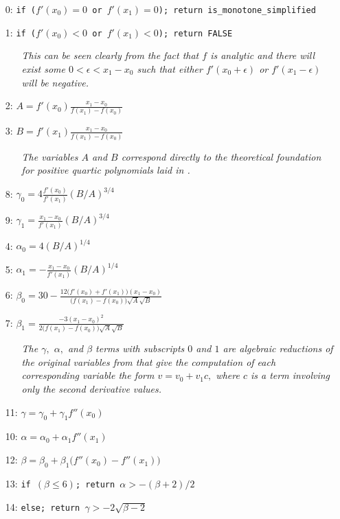 \documentclass{article}
\begin{document}
\begin{itemize}
  \itemsep0pt
  \parskip0pt

\item[0:] \texttt{if ($f'(x_0) = 0$ or $f'(x_1) = 0$); return is\_monotone\_simplified}
\item[1:] \texttt{if ($f'(x_0) < 0$ or $f'(x_1) < 0$); return FALSE}
  \begin{itemize}
    \item[] \textit{This can be seen clearly from the fact that $f$ is analytic and there will exist some $0 < \epsilon < x_1 - x_0$ such that either $f'(x_0 + \epsilon)$ or $f'(x_1 - \epsilon)$ will be negative.}
  \end{itemize}

\item[2:] $A = f'(x_0)\frac{x_1 - x_0}{f(x_1) - f(x_0)}$
\item[3:] $B = f'(x_1) \frac{x_1 - x_0}{f(x_1) - f(x_0)}$
  \begin{itemize}
    \item[] \textit{The variables $A$ and $B$ correspond directly to the theoretical foundation for positive quartic polynomials laid in \cite{ulrich1994positivity}.}
  \end{itemize}
\item[8:] $\gamma_0 = 4 \frac{f'(x_0)}{f'(x_1)} (B/A)^{3/4}$
\item[9:] $\gamma_1 = \frac{x_1 - x_0}{f'(x_1)} (B/A)^{3/4}$
\item[4:] $\alpha_0 = 4 (B/A)^{1/4}$
\item[5:] $\alpha_1 = -\frac{x_1 - x_0}{f'(x_1)} (B/A)^{1/4}$
\item[6:] $\beta_0 = 30 - \frac{12 \big(f'(x_0) + f'(x_1)\big) (x_1 - x_0)}{\big(f(x_1) - f(x_0)\big) \sqrt{A}\sqrt{B}}$
\item[7:] $\beta_1 = \frac{-3 (x_1 - x_0)^2}{2 \big(f(x_1) - f(x_0)\big) \sqrt{A} \sqrt{B}} $
  \begin{itemize}
    \item[] \textit{The $\gamma,$ $\alpha,$ and $\beta$ terms with subscripts $0$ and $1$ are algebraic reductions of the original variables from \cite{ulrich1994positivity} that give the computation of each corresponding variable the form  $v = v_0 + v_1 c,$ where $c$ is a term involving only the second derivative values.}
  \end{itemize}
\item[11:] $\gamma = \gamma_0 + \gamma_1 f''(x_0)$
\item[10:] $\alpha = \alpha_0 + \alpha_1 f''(x_1)$
\item[12:] $\beta = \beta_0 + \beta_1 \big(f''(x_0) - f''(x_1)\big)$
\item[13:] \texttt{if $(\beta \leq 6)$; return $\alpha > - (\beta + 2) / 2$}
\item[14:] \texttt{else; return $\gamma > -2 \sqrt{\beta - 2}$ }

\end{itemize}
\end{document}
